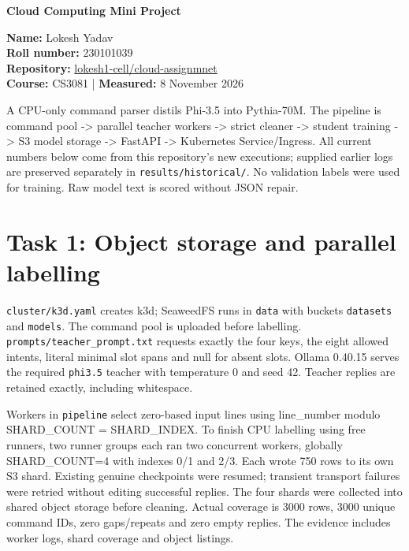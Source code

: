 \documentclass[10pt,a4paper]{article}
\begin{document}
\begin{center}{\LARGE\bfseries Cloud Computing Mini Project}\end{center}

\textbf{Name:} Lokesh Yadav\\ \textbf{Roll number:} 230101039\\ \textbf{Repository:} \href{https://github.com/lokesh1-cell/cloud-assignmnet.git}{lokesh1-cell/cloud-assignmnet}\\ \textbf{Course:} CS3081 | \textbf{Measured:} 8 November 2026


A CPU-only command parser distils Phi-3.5 into Pythia-70M. The pipeline is command pool -\textgreater{} parallel teacher workers -\textgreater{} strict cleaner -\textgreater{} student training -\textgreater{} S3 model storage -\textgreater{} FastAPI -\textgreater{} Kubernetes Service/Ingress. All current numbers below come from this repository's new executions; supplied earlier logs are preserved separately in \texttt{results/\allowbreak{}historical/\allowbreak{}}. No validation labels were used for training. Raw model text is scored without JSON repair.


\section{Task 1: Object storage and parallel labelling}

\texttt{cluster/\allowbreak{}k3d.yaml} creates k3d; SeaweedFS runs in \texttt{data} with buckets \texttt{datasets} and \texttt{models}. The command pool is uploaded before labelling. \texttt{prompts/\allowbreak{}teacher\_\allowbreak{}prompt.txt} requests exactly the four keys, the eight allowed intents, literal minimal slot spans and null for absent slots. Ollama 0.40.15 serves the required \texttt{phi3.5} teacher with temperature 0 and seed 42. Teacher replies are retained exactly, including whitespace.


Workers in \texttt{pipeline} select zero-based input lines using line\_number modulo SHARD\_COUNT = SHARD\_INDEX. To finish CPU labelling using free runners, two runner groups each ran two concurrent workers, globally SHARD\_COUNT=4 with indexes 0/1 and 2/3. Each wrote 750 rows to its own S3 shard. Existing genuine checkpoints were resumed; transient transport failures were retried without editing successful replies. The four shards were collected into shared object storage before cleaning. Actual coverage is 3000 rows, 3000 unique command IDs, zero gaps/repeats and zero empty replies. The evidence includes worker logs, shard coverage and object listings.
\end{document}
